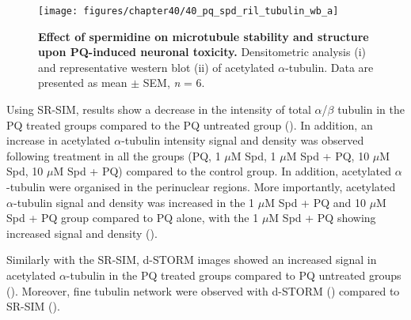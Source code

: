 \begin{figure}[!htbp]
\center
  \texttt{[image: figures/chapter40/40\_pq\_spd\_ril\_tubulin\_wb\_a]}
  \caption[Effect of spermidine on microtubule stability and structure upon PQ-induced neuronal toxicity]{\textbf{Effect of spermidine on microtubule stability and structure upon PQ-induced neuronal toxicity.} Densitometric analysis (i) and representative western blot  (ii) of acetylated $\alpha$-tubulin. Data are presented as mean $\pm$ SEM, \textit{n} = 6.}
  \label{fig:40_pq_spd_ril_tubulin_wb_a}
\end{figure} 

Using SR-SIM, results show a decrease in the intensity of total $\alpha$/$\beta$ tubulin in the PQ treated groups compared to the PQ untreated group (). In addition, an increase in acetylated $\alpha$-tubulin intensity signal and density was observed following treatment in all the groups (PQ, 1 $\mu$M Spd, 1 $\mu$M Spd + PQ, 10 $\mu$M Spd, 10 $\mu$M Spd + PQ) compared to the control group. In addition, acetylated $\alpha$-tubulin were organised in the perinuclear regions. More importantly, acetylated $\alpha$-tubulin signal and density was increased in the 1 $\mu$M Spd + PQ and 10 $\mu$M Spd + PQ group compared to PQ alone, with the 1 $\mu$M Spd + PQ showing increased signal and density (). 

Similarly with the SR-SIM, d-STORM images showed an increased signal in acetylated $\alpha$-tubulin in the PQ treated groups compared to PQ untreated groups (). Moreover, fine tubulin network were observed with d-STORM () compared to SR-SIM ().

